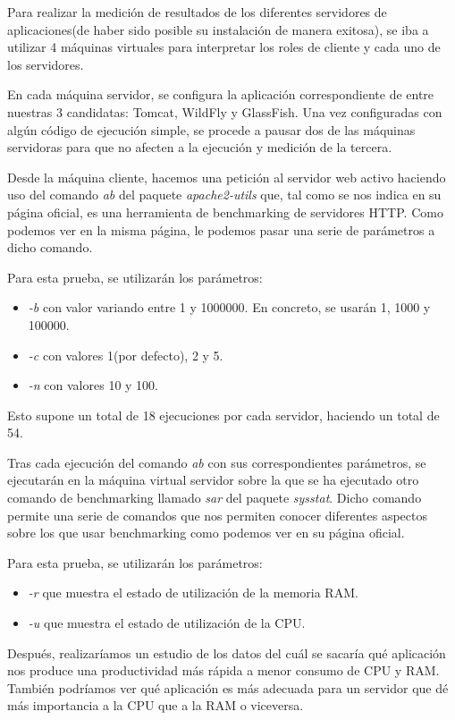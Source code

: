\documentclass[a4paper, 10pt]{article}
\begin{document}
	Para realizar la medición de resultados de los diferentes servidores de aplicaciones(de haber
	sido posible su instalación de manera exitosa), se iba a utilizar 4 máquinas virtuales para
	interpretar los roles de cliente y cada uno de los servidores.
	
	En cada máquina servidor, se configura la aplicación correspondiente de entre nuestras 3 
	candidatas: Tomcat, WildFly y GlassFish. Una vez configuradas con algún código de ejecución
	simple, se procede a pausar dos de las máquinas servidoras para que no afecten a la ejecución
	y medición de la tercera.
	
	Desde la máquina cliente, hacemos una petición al servidor web activo haciendo uso del comando
	\textit{ab} del paquete \textit{apache2-utils} que, tal como se nos indica en su página
	oficial\cite{AB_official}, es una herramienta de benchmarking de servidores HTTP. Como podemos
	 ver en la misma página, le podemos pasar una serie de parámetros a dicho comando.
	
	Para esta prueba, se utilizarán los parámetros:
	\begin{itemize}
		\item \textit{-b} con valor variando entre 1 y 1000000. En concreto, se usarán 1, 1000 y 100000.
		\item \textit{-c} con valores 1(por defecto), 2 y 5.
		\item \textit{-n} con valores 10 y 100.
	\end{itemize}
	
	Esto supone un total de 18 ejecuciones por cada servidor, haciendo un total de 54.
	
	Tras cada ejecución del comando \textit{ab} con sus correspondientes parámetros, se ejecutarán
	en la máquina virtual servidor sobre la que se ha ejecutado otro comando de benchmarking llamado
	\textit{sar} del paquete \textit{sysstat}. Dicho comando permite una serie de comandos que nos
	permiten conocer diferentes aspectos sobre los que usar benchmarking como podemos ver en su página
	oficial\cite{SAR_official}.
	
	Para esta prueba, se utilizarán los parámetros:
	\begin{itemize}
		\item \textit{-r} que muestra el estado de utilización de la memoria RAM.
		\item \textit{-u} que muestra el estado de utilización de la CPU.
	\end{itemize}
	
	Después, realizaríamos un estudio de los datos del cuál se sacaría qué aplicación nos produce
	una productividad más rápida a menor consumo de CPU y RAM. También podríamos ver qué aplicación
	es más adecuada para un servidor que dé más importancia a la CPU que a la RAM o viceversa.
\end{document}
